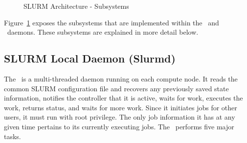 %

\begin{figure}[tb]
\centerline{}
\caption{SLURM Architecture - Subsystems}
\label{archdetail}
\end{figure}

Figure~\ref{archdetail} exposes the subsystems that are implemented
within the \slurmd\ and \slurmctld\ daemons.  These subsystems
are explained in more detail below.

\subsection{SLURM Local Daemon (Slurmd)}

The \slurmd\ is a multi-threaded daemon running on each compute node.
It reads the common SLURM configuration file and recovers any 
previously saved state information, 
notifies the controller that it is active, waits for work, 
executes the work, returns status, and waits for more work.  
Since it initiates jobs for other users, it must run with root privilege.
The only job information it has at any given time pertains to its 
currently executing jobs.
The \slurmd\ performs five major tasks.

